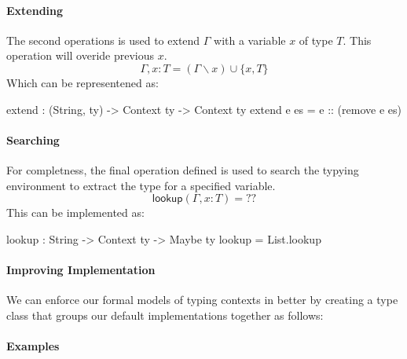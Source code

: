 \paragraph{Extending}
\label{sec:typed-arith-var:types:extend}

The second operations is used to extend $\Gamma$ with a variable $x$ of type $T$.
This operation will overide previous $x$.
\[
\Gamma,x:T = (\Gamma\backslash x)\cup\{x,T\}
\]
\noindent
Which can be representened as:
\begin{code}
extend : (String, ty) -> Context ty -> Context ty
extend e es = e :: (remove e es)
\end{code}

\paragraph{Searching}
\label{sec:typed-arith-var:types:lookup}

For completness, the final operation defined is used to search the typying environment to extract the type for a specified variable.
\[
\mathsf{lookup}(\Gamma,x:T) = \text{??}
\]
\noindent
This can be implemented as:
\begin{code}
lookup : String -> Context ty -> Maybe ty
lookup = List.lookup
\end{code}

\paragraph{Improving \idris{} Implementation}
\label{sec:typed-arith-var:types:classes}

We can enforce our formal models of typing contexts in \idris{} better by creating a type class that groups our default implementations together as follows:


\paragraph{Examples}
\label{sec:typed-arith-var:types:examples}

